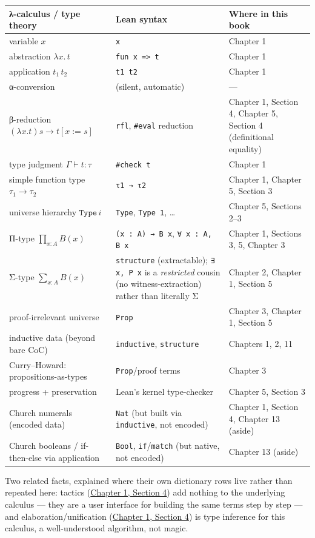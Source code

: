 {\small\begin{tabular}{
  >{\raggedright\arraybackslash}p{}
  >{\raggedright\arraybackslash}p{}
  >{\raggedright\arraybackslash}p{}
}
\toprule
λ-calculus / type theory & Lean syntax & Where in this book \\
\midrule
variable \(x\) & \texttt{x} & Chapter 1 \\
abstraction \(\lambda x.\, t\) & \texttt{fun x => t} & Chapter 1 \\
application \(t_1\, t_2\) & \texttt{t1 t2} & Chapter 1 \\
α-conversion & (silent, automatic) & --- \\
β-reduction \((\lambda x.t)s \to t[x:=s]\) & \texttt{rfl}, \texttt{\#eval} reduction & Chapter 1, Section 4, Chapter 5, Section 4 (definitional equality) \\
type judgment \(\Gamma \vdash t : \tau\) & \texttt{\#check t} & Chapter 1 \\
simple function type \(\tau_1 \to \tau_2\) & \texttt{τ1 → τ2} & Chapter 1, Chapter 5, Section 3 \\
universe hierarchy \(\mathtt{Type}\,i\) & \texttt{Type}, \texttt{Type 1}, \ldots{} & Chapter 5, Sections 2--3 \\
Π-type \(\prod_{x:A} B(x)\) & \texttt{(x : A) → B x}, \texttt{∀ x : A, B x} & Chapter 1, Sections 3, 5, Chapter 3 \\
Σ-type \(\sum_{x:A} B(x)\) & \texttt{structure} (extractable); \texttt{∃ x, P x} is a \emph{restricted} cousin (no witness-extraction) rather than literally Σ & Chapter 2, Chapter 1, Section 5 \\
proof-irrelevant universe & \texttt{Prop} & Chapter 3, Chapter 1, Section 5 \\
inductive data (beyond bare CoC) & \texttt{inductive}, \texttt{structure} & Chapters 1, 2, 11 \\
Curry--Howard: propositions-as-types & \texttt{Prop}/proof terms & Chapter 3 \\
progress + preservation & Lean's kernel type-checker & Chapter 5, Section 3 \\
Church numerals (encoded data) & \texttt{Nat} (but built via \texttt{inductive}, not encoded) & Chapter 1, Section 4, Chapter 13 (aside) \\
Church booleans / if-then-else via application & \texttt{Bool}, \texttt{if}/\texttt{match} (but native, not encoded) & Chapter 13 (aside) \\
\bottomrule
\end{tabular}}


Two related facts, explained where their own dictionary rows live rather than repeated here: tactics (\hyperref[sec:01-basics:04-terminology:1]{Chapter 1, Section 4}) add nothing to the underlying calculus --- they are a user interface for building the same terms step by step --- and elaboration/unification (\hyperref[sec:01-basics:04-terminology:1]{Chapter 1, Section 4}) is type inference for this calculus, a well-understood algorithm, not magic.
